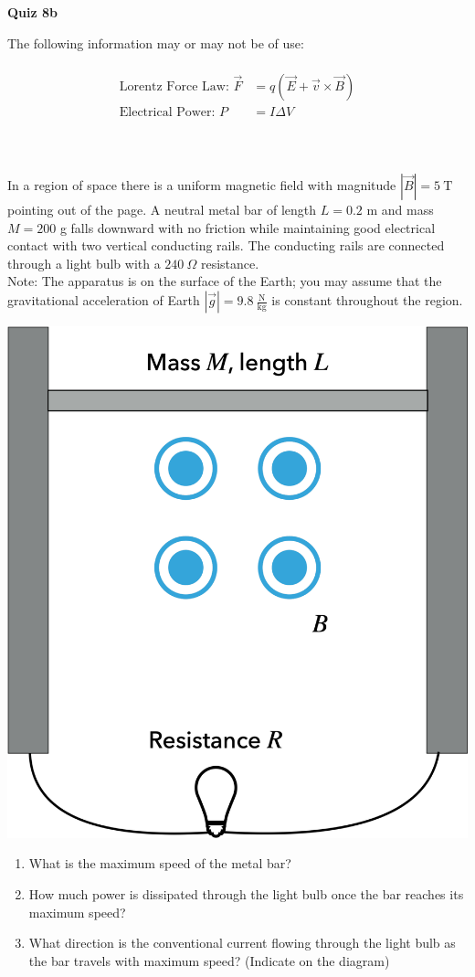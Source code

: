 \documentclass{article}
\begin{document}
	\fancyfoot[C]{\thepage}
	\vspace*{0cm}
	\begin{center}
		{\LARGE \textbf{Quiz 8b}}
	\end{center}
	
The following information may or may not be of use:\\
\hrulefill\\
\begin{align*}
	\text{Lorentz Force Law: } \vec{F}&=q\left(\vec{E}+\vec{v}\times\vec{B}\right)\\
	\text{Electrical Power: } P &= I\Delta V\\
\end{align*}

\hrulefill \\
\\

In a region of space there is a uniform magnetic field with magnitude $\left|\vec{B}\right|=5\ \mathrm{T}$ pointing out of the page. A neutral metal bar of length $L=0.2$ m and mass $M=200$ g falls downward with no friction while maintaining good electrical contact with two vertical conducting rails. The conducting rails are connected through a light bulb with a $240\ \Omega$ resistance.\\

Note: The apparatus is on the surface of the Earth; you may assume that the gravitational acceleration of Earth $|\vec{g}|= 9.8\ \mathrm{\frac{N}{kg}}$ is constant throughout the region.

\begin{center}
	\includegraphics[width=.4\textwidth]{memf}
\end{center}


\begin{enumerate}
	\item What is the maximum speed of the metal bar?
	\item How much power is dissipated through the light bulb once the bar reaches its maximum speed?
	\item What direction is the conventional current flowing through the light bulb as the bar travels with maximum speed? (Indicate on the diagram)

\end{enumerate}
\end{document}

